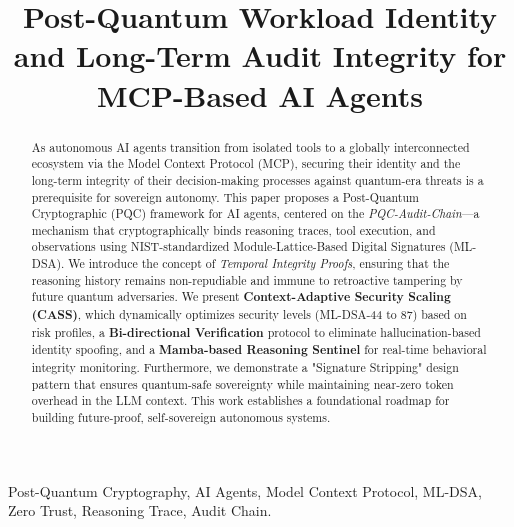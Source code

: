 \documentclass[conference]{IEEEtran}
\begin{document}
\title{Post-Quantum Workload Identity and Long-Term Audit Integrity for MCP-Based AI Agents}

\author{
}

\maketitle

\begin{abstract}
As autonomous AI agents transition from isolated tools to a globally interconnected ecosystem via the Model Context Protocol (MCP), securing their identity and the long-term integrity of their decision-making processes against quantum-era threats is a prerequisite for sovereign autonomy. This paper proposes a Post-Quantum Cryptographic (PQC) framework for AI agents, centered on the \textit{PQC-Audit-Chain}---a mechanism that cryptographically binds reasoning traces, tool execution, and observations using NIST-standardized Module-Lattice-Based Digital Signatures (ML-DSA). We introduce the concept of \textit{Temporal Integrity Proofs}, ensuring that the reasoning history remains non-repudiable and immune to retroactive tampering by future quantum adversaries. We present \textbf{Context-Adaptive Security Scaling (CASS)}, which dynamically optimizes security levels (ML-DSA-44 to 87) based on risk profiles, a \textbf{Bi-directional Verification} protocol to eliminate hallucination-based identity spoofing, and a \textbf{Mamba-based Reasoning Sentinel} for real-time behavioral integrity monitoring. Furthermore, we demonstrate a "Signature Stripping" design pattern that ensures quantum-safe sovereignty while maintaining near-zero token overhead in the LLM context. This work establishes a foundational roadmap for building future-proof, self-sovereign autonomous systems.
\end{abstract}

\begin{IEEEkeywords}
Post-Quantum Cryptography, AI Agents, Model Context Protocol, ML-DSA, Zero Trust, Reasoning Trace, Audit Chain.
\end{IEEEkeywords}
\end{document}
